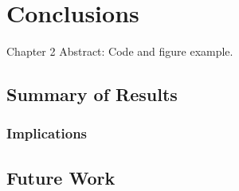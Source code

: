 \chapter{Conclusions}
\begin{chapterabstract}
    Chapter 2 Abstract: Code and figure example.
\end{chapterabstract}
    



\section{Summary of Results}

\subsection{Implications}


\section{Future Work}
